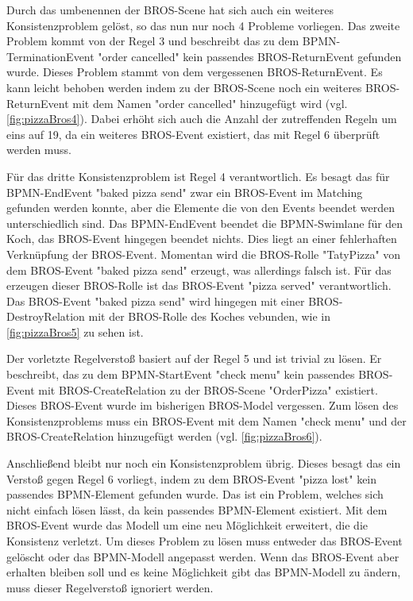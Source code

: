 Durch das umbenennen der BROS-Scene hat sich auch ein weiteres Konsistenzproblem gelöst, so das nun nur noch 4 Probleme vorliegen.
Das zweite Problem kommt von der Regel 3 und beschreibt das zu dem BPMN-TerminationEvent "order cancelled" kein passendes BROS-ReturnEvent gefunden wurde.
Dieses Problem stammt von dem vergessenen BROS-ReturnEvent.
Es kann leicht behoben werden indem zu der BROS-Scene noch ein weiteres BROS-ReturnEvent mit dem Namen "order cancelled" hinzugefügt wird (vgl. \cref{fig:pizzaBros4}). 
Dabei erhöht sich auch die Anzahl der zutreffenden Regeln um eins auf 19, da ein weiteres BROS-Event existiert, das mit Regel 6 überprüft werden muss.

Für das dritte Konsistenzproblem ist Regel 4 verantwortlich.
Es besagt das für BPMN-EndEvent "baked pizza send" zwar ein BROS-Event im Matching gefunden werden konnte, aber die Elemente die von den Events beendet werden unterschiedlich sind.
Das BPMN-EndEvent beendet die BPMN-Swimlane für den Koch, das BROS-Event hingegen beendet nichts.
Dies liegt an einer fehlerhaften Verknüpfung der BROS-Event.
Momentan wird die BROS-Rolle "TatyPizza" von dem BROS-Event "baked pizza send" erzeugt, was allerdings falsch ist.
Für das erzeugen dieser BROS-Rolle ist das BROS-Event "pizza served" verantwortlich.
Das BROS-Event "baked pizza send" wird hingegen mit einer BROS-DestroyRelation mit der BROS-Rolle des Koches vebunden, wie in \cref{fig:pizzaBros5} zu sehen ist.

Der vorletzte Regelverstoß basiert auf der Regel 5 und ist trivial zu lösen.
Er beschreibt, das zu dem BPMN-StartEvent "check menu" kein passendes BROS-Event mit BROS-CreateRelation zu der BROS-Scene "OrderPizza" existiert.
Dieses BROS-Event wurde im bisherigen BROS-Model vergessen.
Zum lösen des Konsistenzproblems muss ein BROS-Event mit dem Namen "check menu" und der BROS-CreateRelation hinzugefügt werden (vgl. \cref{fig:pizzaBros6}).

Anschließend bleibt nur noch ein Konsistenzproblem übrig.
Dieses besagt das ein Verstoß gegen Regel 6 vorliegt, indem zu dem BROS-Event "pizza lost" kein passendes BPMN-Element gefunden wurde.
Das ist ein Problem, welches sich nicht einfach lösen lässt, da kein passendes BPMN-Element existiert.
Mit dem BROS-Event wurde das Modell um eine neu Möglichkeit erweitert, die die Konsistenz verletzt.
Um dieses Problem zu lösen muss entweder das BROS-Event gelöscht oder das BPMN-Modell angepasst werden.
Wenn das BROS-Event aber erhalten bleiben soll und es keine Möglichkeit gibt das BPMN-Modell zu ändern, muss dieser Regelverstoß ignoriert werden.


